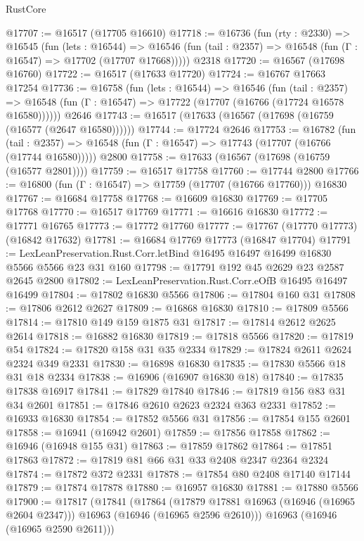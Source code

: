 \begin{lexlean}{RustCore}
\begin{coremodule}
@17707 := @16517 (@17705 @16610)
@17718 := @16736
    (fun (rty : @2330) =>
    @16545
      (fun (lets : @16544) =>
      @16546 (fun (tail : @2357) => @16548 (fun (Γ : @16547) => @17702 (@17707 @17668)))))
    @2318
@17720 := @16567 (@17698 @16760)
@17722 := @16517 (@17633 @17720)
@17724 := @16767 @17663 @17254
@17736 := @16758
    (fun (lets : @16544) =>
    @16546
      (fun (tail : @2357) =>
      @16548 (fun (Γ : @16547) => @17722 (@17707 (@16766 (@17724 @16578 @16580))))))
    @2646
@17743 := @16517 (@17633 (@16567 (@17698 (@16759 (@16577 (@2647 @16580))))))
@17744 := @17724 @2646
@17753 := @16782
    (fun (tail : @2357) => @16548 (fun (Γ : @16547) => @17743 (@17707 (@16766 (@17744 @16580)))))
    @2800
@17758 := @17633 (@16567 (@17698 (@16759 (@16577 @2801))))
@17759 := @16517 @17758
@17760 := @17744 @2800
@17766 := @16800 (fun (Γ : @16547) => @17759 (@17707 (@16766 @17760))) @16830
@17767 := @16684 @17758
@17768 := @16609 @16830
@17769 := @17705 @17768
@17770 := @16517 @17769
@17771 := @16616 @16830
@17772 := @17771 @16765
@17773 := @17772 @17760
@17777 := @17767 (@17770 @17773) (@16842 @17632)
@17781 := @16684 @17769 @17773 (@16847 @17704)
@17791 := LexLeanPreservation.Rust.Corr.letBind @16495 @16497 @16499 @16830 @5566 @5566 @23 @31 @160
@17798 := @17791 @192 @45 @2629 @23 @2587 @2645 @2800
@17802 := LexLeanPreservation.Rust.Corr.eOfB @16495 @16497 @16499
@17804 := @17802 @16830 @5566
@17806 := @17804 @160 @31
@17808 := @17806 @2612 @2627
@17809 := @16868 @16830
@17810 := @17809 @5566
@17814 := @17810 @149 @159 @1875 @31
@17817 := @17814 @2612 @2625 @2614
@17818 := @16882 @16830
@17819 := @17818 @5566
@17820 := @17819 @54
@17824 := @17820 @158 @31 @35 @2334
@17829 := @17824 @2611 @2624 @2324 @349 @2331
@17830 := @16898 @16830
@17835 := @17830 @5566 @18 @31 @18 @2334
@17838 := @16906 (@16907 @16830 @18)
@17840 := @17835 @17838 @16917
@17841 := @17829 @17840
@17846 := @17819 @156 @83 @31 @34 @2601
@17851 := @17846 @2610 @2623 @2324 @363 @2331
@17852 := @16933 @16830
@17854 := @17852 @5566 @31
@17856 := @17854 @155 @2601
@17858 := @16941 (@16942 @2601)
@17859 := @17856 @17858
@17862 := @16946 (@16948 @155 @31)
@17863 := @17859 @17862
@17864 := @17851 @17863
@17872 := @17819 @81 @66 @31 @33 @2408 @2347 @2364 @2324
@17874 := @17872 @372 @2331
@17878 := @17854 @80 @2408 @17140 @17144
@17879 := @17874 @17878
@17880 := @16957 @16830
@17881 := @17880 @5566
@17900 := @17817
    (@17841
      (@17864
        (@17879 @17881 @16963 (@16946 (@16965 @2604 @2347)))
        @16963
        (@16946 (@16965 @2596 @2610)))
      @16963
      (@16946 (@16965 @2590 @2611)))

\end{coremodule}
\end{lexlean}
